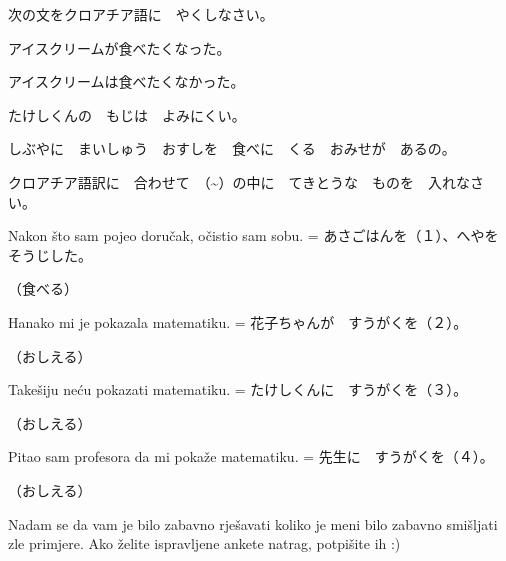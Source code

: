 	\begin{mondai}{次の文をクロアチア語に　やくしなさい。}
		\item アイスクリームが食べたくなった。
		\item アイスクリームは食べたくなかった。
		\item たけしくんの　もじは　よみにくい。
		\item しぶやに　まいしゅう　おすしを　食べに　くる　おみせが　あるの。
	\end{mondai}

	\begin{mondai}{クロアチア語訳に　合わせて　（\textasciitilde）の中に　てきとうな　ものを　入れなさい。}
		\item Nakon što sam pojeo doručak, očistio sam sobu. = あさごはんを（１）、へやを　そうじした。
		
		（食べる）
		\item Hanako mi je pokazala matematiku. = 花子ちゃんが　すうがくを（２）。
		
		（おしえる）
		\item Takešiju neću pokazati matematiku. = たけしくんに　すうがくを（３）。
		
		（おしえる）
		\item Pitao sam profesora da mi pokaže matematiku. = 先生に　すうがくを（４）。
		
		（おしえる）
	\end{mondai}

	Nadam se da vam je bilo zabavno rješavati koliko je meni bilo zabavno smišljati zle primjere. Ako želite ispravljene ankete natrag, potpišite ih :)
